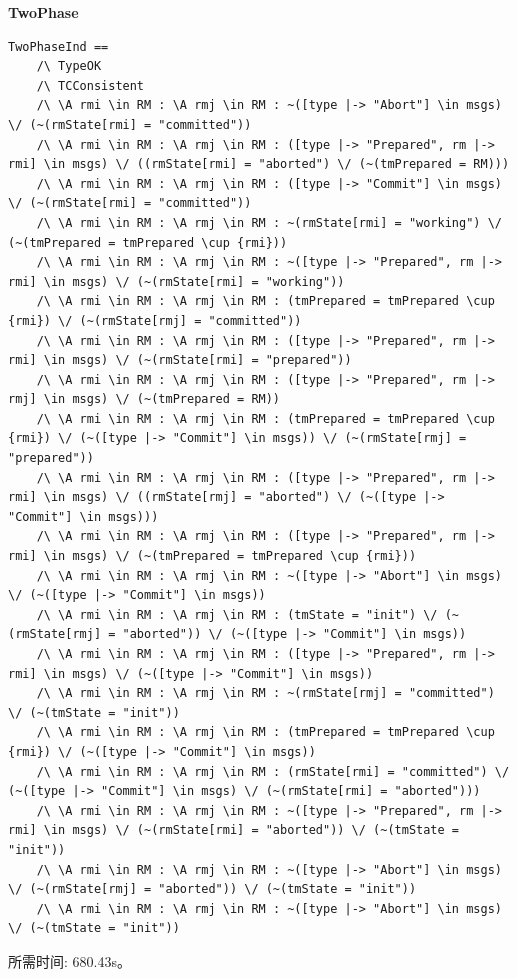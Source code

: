 \textbf{TwoPhase}
\begin{lstlisting}
TwoPhaseInd ==
    /\ TypeOK
    /\ TCConsistent
    /\ \A rmi \in RM : \A rmj \in RM : ~([type |-> "Abort"] \in msgs) \/ (~(rmState[rmi] = "committed"))
    /\ \A rmi \in RM : \A rmj \in RM : ([type |-> "Prepared", rm |-> rmi] \in msgs) \/ ((rmState[rmi] = "aborted") \/ (~(tmPrepared = RM)))
    /\ \A rmi \in RM : \A rmj \in RM : ([type |-> "Commit"] \in msgs) \/ (~(rmState[rmi] = "committed"))
    /\ \A rmi \in RM : \A rmj \in RM : ~(rmState[rmi] = "working") \/ (~(tmPrepared = tmPrepared \cup {rmi}))
    /\ \A rmi \in RM : \A rmj \in RM : ~([type |-> "Prepared", rm |-> rmi] \in msgs) \/ (~(rmState[rmi] = "working"))
    /\ \A rmi \in RM : \A rmj \in RM : (tmPrepared = tmPrepared \cup {rmi}) \/ (~(rmState[rmj] = "committed"))
    /\ \A rmi \in RM : \A rmj \in RM : ([type |-> "Prepared", rm |-> rmi] \in msgs) \/ (~(rmState[rmi] = "prepared"))
    /\ \A rmi \in RM : \A rmj \in RM : ([type |-> "Prepared", rm |-> rmj] \in msgs) \/ (~(tmPrepared = RM))
    /\ \A rmi \in RM : \A rmj \in RM : (tmPrepared = tmPrepared \cup {rmi}) \/ (~([type |-> "Commit"] \in msgs)) \/ (~(rmState[rmj] = "prepared"))
    /\ \A rmi \in RM : \A rmj \in RM : ([type |-> "Prepared", rm |-> rmi] \in msgs) \/ ((rmState[rmj] = "aborted") \/ (~([type |-> "Commit"] \in msgs)))
    /\ \A rmi \in RM : \A rmj \in RM : ([type |-> "Prepared", rm |-> rmi] \in msgs) \/ (~(tmPrepared = tmPrepared \cup {rmi}))
    /\ \A rmi \in RM : \A rmj \in RM : ~([type |-> "Abort"] \in msgs) \/ (~([type |-> "Commit"] \in msgs))
    /\ \A rmi \in RM : \A rmj \in RM : (tmState = "init") \/ (~(rmState[rmj] = "aborted")) \/ (~([type |-> "Commit"] \in msgs))
    /\ \A rmi \in RM : \A rmj \in RM : ([type |-> "Prepared", rm |-> rmi] \in msgs) \/ (~([type |-> "Commit"] \in msgs))
    /\ \A rmi \in RM : \A rmj \in RM : ~(rmState[rmj] = "committed") \/ (~(tmState = "init"))
    /\ \A rmi \in RM : \A rmj \in RM : (tmPrepared = tmPrepared \cup {rmi}) \/ (~([type |-> "Commit"] \in msgs))
    /\ \A rmi \in RM : \A rmj \in RM : (rmState[rmi] = "committed") \/ (~([type |-> "Commit"] \in msgs) \/ (~(rmState[rmi] = "aborted")))
    /\ \A rmi \in RM : \A rmj \in RM : ~([type |-> "Prepared", rm |-> rmi] \in msgs) \/ (~(rmState[rmi] = "aborted")) \/ (~(tmState = "init"))
    /\ \A rmi \in RM : \A rmj \in RM : ~([type |-> "Abort"] \in msgs) \/ (~(rmState[rmj] = "aborted")) \/ (~(tmState = "init"))
    /\ \A rmi \in RM : \A rmj \in RM : ~([type |-> "Abort"] \in msgs) \/ (~(tmState = "init"))
\end{lstlisting}
所需时间: 680.43s。

